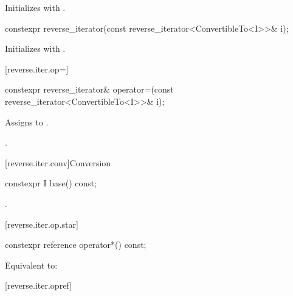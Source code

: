 \begin{itemdescr}
\pnum
\effects
Initializes
with .
\end{itemdescr}

%
\begin{itemdecl}
constexpr reverse_iterator(const reverse_iterator<ConvertibleTo<I>>& i);
\end{itemdecl}

\begin{itemdescr}
\pnum
\effects
Initializes
with
.
\end{itemdescr}

[reverse.iter.op=]{}

%
\begin{itemdecl}
constexpr reverse_iterator&
  operator=(const reverse_iterator<ConvertibleTo<I>>& i);
\end{itemdecl}

\begin{itemdescr}
\pnum
\effects
Assigns  to .

\pnum
\returns
{}.
\end{itemdescr}

[reverse.iter.conv]{Conversion}

%
%
\begin{itemdecl}
constexpr I base() const;
\end{itemdecl}

\begin{itemdescr}
\pnum
\returns
{}.
\end{itemdescr}

[reverse.iter.op.star]{}

%
\begin{itemdecl}
constexpr reference operator*() const;
\end{itemdecl}

\begin{itemdescr}
\pnum
\effects Equivalent to: 
\end{itemdescr}

[reverse.iter.opref]{}

